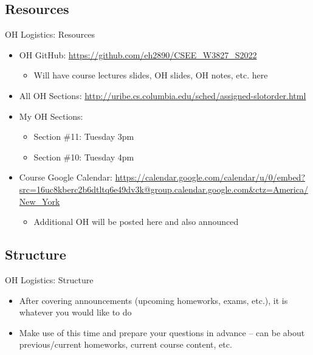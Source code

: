 \documentclass{../slides}
\begin{document}
\subsection{Resources}
\begin{frame}{OH Logistics: Resources}
    \begin{itemize}
        \item OH GitHub: \url{https://github.com/eh2890/CSEE_W3827_S2022}
        \begin{itemize}
            \item Will have course lectures slides, OH slides, OH notes, etc. here
        \end{itemize}
        \item All OH Sections: \url{http://uribe.cs.columbia.edu/sched/assigned-slotorder.html}
        \item My OH Sections:
        \begin{itemize}
            \item Section \#11: Tuesday 3pm
            \item Section \#10: Tuesday 4pm
        \end{itemize}
        \item Course Google Calendar: \url{https://calendar.google.com/calendar/u/0/embed?src=16uc8kberc2b6dtltq6e49dv3k@group.calendar.google.com&ctz=America/New_York}
        \begin{itemize}
            \item Additional OH will be posted here and also announced
        \end{itemize}
    \end{itemize}
\end{frame}

\subsection{Structure}
\begin{frame}{OH Logistics: Structure}
    \begin{itemize}
        \item After covering announcements (upcoming homeworks, exams, etc.), it is whatever you would like to do
        \item Make use of this time and prepare your questions in advance -- can be about previous/current homeworks, current course content, etc.
    \end{itemize}
\end{frame}
\end{document}
